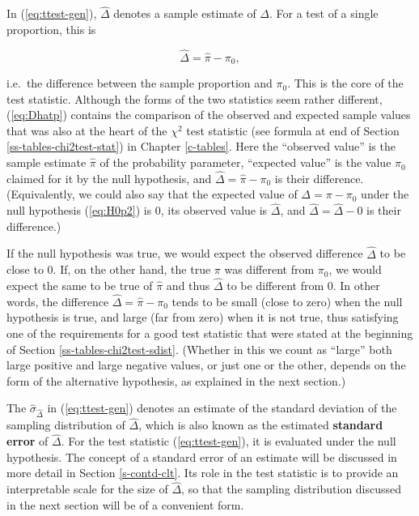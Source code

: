 \documentclass[11pt,a4paper,openany]{book}
\begin{document}
In (\ref{eq:ttest-gen}), \(\hat{\Delta}\) denotes a sample estimate of
\(\Delta\). For a test of a single proportion, this is

\begin{equation}\hat{\Delta} = \hat{\pi}-\pi_{0},
\label{eq:Dhatp}\end{equation}

i.e.~the difference between the sample proportion and \(\pi_{0}\). This
is the core of the test statistic. Although the forms of the two
statistics seem rather different, (\ref{eq:Dhatp}) contains the
comparison of the observed and expected sample values that was also at
the heart of the \(\chi^{2}\) test statistic (see formula at end of
Section \ref{ss-tables-chi2test-stat}) in Chapter \ref{c-tables}. Here
the ``observed value'' is the sample estimate \(\hat{\pi}\) of the
probability parameter, ``expected value'' is the value \(\pi_{0}\)
claimed for it by the null hypothesis, and
\(\hat{\Delta}=\hat{\pi}-\pi_{0}\) is their difference. (Equivalently,
we could also say that the expected value of \(\Delta=\pi-\pi_{0}\)
under the null hypothesis (\ref{eq:H0p2}) is 0, its observed value is
\(\hat{\Delta}\), and \(\hat{\Delta}=\hat{\Delta}-0\) is their
difference.)

If the null hypothesis was true, we would expect the observed difference
\(\hat{\Delta}\) to be close to 0. If, on the other hand, the true
\(\pi\) was different from \(\pi_{0}\), we would expect the same to be
true of \(\hat{\pi}\) and thus \(\hat{\Delta}\) to be different from 0.
In other words, the difference \(\hat{\Delta}=\hat{\pi}-\pi_{0}\) tends
to be small (close to zero) when the null hypothesis is true, and large
(far from zero) when it is not true, thus satisfying one of the
requirements for a good test statistic that were stated at the beginning
of Section \ref{ss-tables-chi2test-sdist}. (Whether in this we count as
``large'' both large positive and large negative values, or just one or
the other, depends on the form of the alternative hypothesis, as
explained in the next section.)

The \(\hat{\sigma}_{\hat{\Delta}}\) in (\ref{eq:ttest-gen}) denotes an
estimate of the standard deviation of the sampling distribution of
\(\hat{\Delta}\), which is also known as the estimated \textbf{standard
error} of \(\hat{\Delta}\). For the test statistic (\ref{eq:ttest-gen}),
it is evaluated under the null hypothesis. The concept of a standard
error of an estimate will be discussed in more detail in Section
\ref{s-contd-clt}. Its role in the test statistic is to provide an
interpretable scale for the size of \(\hat{\Delta}\), so that the
sampling distribution discussed in the next section will be of a
convenient form.
\end{document}
